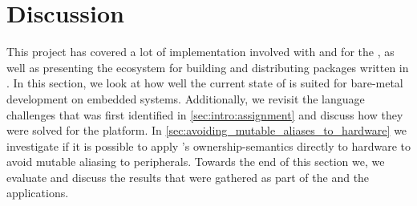 
\chapter{Discussion}
\label{chap:discussion}

This project has covered a lot of implementation involved with {\rust} and {\C} for the {\gecko}, as well as presenting the ecosystem for building and distributing packages written in {\rust}.
In this section, we look at how well the current state of {\rust} is suited for bare-metal development on embedded systems.
Additionally, we revisit the language challenges that was first identified in \autoref{sec:intro:assignment} and discuss how they were solved for the {\rg} platform.
In \autoref{sec:avoiding_mutable_aliases_to_hardware} we investigate if it is possible to apply {\rust}'s ownership-semantics directly to hardware to avoid mutable aliasing to peripherals.
Towards the end of this section we, we evaluate and discuss the results that were gathered as part of the {\tracker} and the {\cg} applications.




